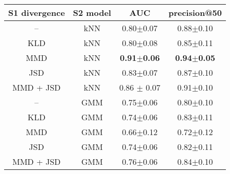 \begin{tabular}{c c c c}
	S1 divergence & S2 model & AUC & precision@50  \\
	\hline
	-- & kNN & 0.80$\pm$0.07 & 0.88$\pm$0.10 \\
	KLD & kNN & 0.80$\pm$0.08 & 0.85$\pm$0.11 \\
	MMD & kNN & \textbf{0.91$\pm$0.06} & \textbf{0.94$\pm$0.05}\\
    JSD & kNN & 0.83$\pm$0.07 & 0.87$\pm$0.10\\
    MMD + JSD & kNN & 0.86 $\pm$ 0.07 & 0.91$\pm$0.10 \\
    -- & GMM & 0.75$\pm$0.06 & 0.80$\pm$0.10\\
	KLD & GMM & 0.74$\pm$0.06 & 0.83$\pm$0.11\\
	MMD & GMM & 0.66$\pm$0.12 & 0.72$\pm$0.12\\
    JSD & GMM & 0.74$\pm$0.06 & 0.82$\pm$0.11\\
    MMD + JSD & GMM & 0.76$\pm$0.06 & 0.84$\pm$0.10
\end{tabular}